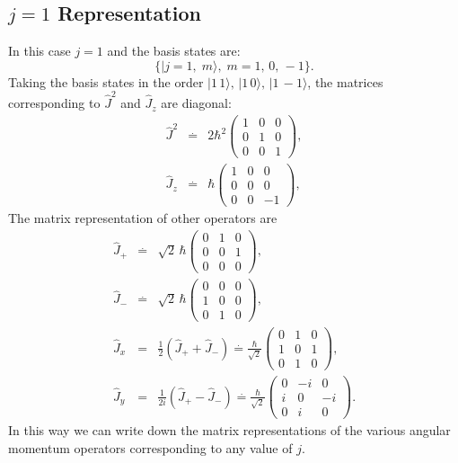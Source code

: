 \subsection{$j=1$ Representation}

In this case $j=1$ and the basis states are:
\[ \{|j=1,\; m\rangle, \; m=1,\, 0,\, -1 \}. \]
Taking the basis states in the order $|1\, 1\rangle,\, |1\, 0\rangle, \, |1\, -1\rangle$, the matrices corresponding to 
$\hat{J}^2$ and $\hat{J}_z$ are diagonal:
\begin{eqnarray}
\hat{J}^2 & \stackrel{.}{=} & 2\hbar^2 \begin{pmatrix}1 & 0 & 0 \\ 0 & 1 & 0 \\ 0 & 0 & 1\end{pmatrix}, \\
\hat{J}_z & \stackrel{.}{=} & \hbar \begin{pmatrix}1 & 0 & 0 \\ 0 & 0 & 0 \\ 0 & 0 & -1\end{pmatrix}, 
\end{eqnarray}
The matrix representation of other operators are
\begin{eqnarray}
\hat{J}_+ & \stackrel{.}{=} & \sqrt{2}\, \hbar \begin{pmatrix}0 & 1 & 0 \\ 0 & 0 & 1 \\ 0 & 0 & 0\end{pmatrix}, \\
\hat{J}_- & \stackrel{.}{=} & \sqrt{2}\, \hbar \begin{pmatrix}0 & 0 & 0 \\ 1 & 0 & 0 \\ 0 & 1 & 0\end{pmatrix}, \\
\hat{J}_x & = & \frac{1}{2}(\hat{J}_+ + \hat{J}_-) \stackrel{.}{=}
\frac{\hbar}{\sqrt{2}} \begin{pmatrix}0 & 1 & 0 \\ 1 & 0 & 1 \\ 0 & 1 & 0\end{pmatrix}, \\
\hat{J}_y & = & \frac{1}{2i}(\hat{J}_+ - \hat{J}_-) \stackrel{.}{=}
\frac{\hbar}{\sqrt{2}} \begin{pmatrix}0 & -i & 0 \\ i & 0 & -i \\ 0 & i & 0\end{pmatrix}. 
\end{eqnarray}
In this way we can write down the matrix representations of the various angular momentum operators corresponding to any value 
of $j$.

